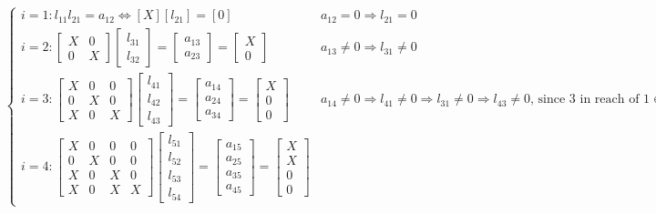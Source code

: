 \documentclass{article}
\begin{document}
\begin{align*}
    &\begin{cases}
        i=1: l_{11}l_{21} = a_{12} \Longleftrightarrow [X][l_{21}] = [0]& a_{12} = 0 \Rightarrow l_{21} = 0 \\
        i=2: \begin{bmatrix} X & 0\\ 0 & X \end{bmatrix} \begin{bmatrix} l_{31} \\ l_{32} \end{bmatrix} = \begin{bmatrix} a_{13}\\a_{23} \end{bmatrix} = \begin{bmatrix} X\\0 \end{bmatrix}& a_{13}\neq 0 \Rightarrow l_{31} \neq 0\\
        i=3: \begin{bmatrix} X & 0 & 0\\ 0 & X & 0\\X & 0 & X \end{bmatrix} \begin{bmatrix} l_{41} \\ l_{42} \\ l_{43} \end{bmatrix} = \begin{bmatrix} a_{14}\\a_{24} \\a_{34}\end{bmatrix} = \begin{bmatrix} X\\0\\0 \end{bmatrix} & a_{14}\neq 0 \Rightarrow l_{41} \neq 0 \Longrightarrow l_{31}\neq 0 \Rightarrow l_{43}\neq 0 \textrm{, since $3$ in reach of $1 \in G_L$}\\
        i=4: \begin{bmatrix} X & 0 & 0&0\\ 0 & X & 0&0\\X & 0 & X &0 \\X&0&X&X\end{bmatrix} \begin{bmatrix} l_{51} \\ l_{52} \\ l_{53}\\l_{54} \end{bmatrix} = \begin{bmatrix} a_{15}\\a_{25} \\a_{35}\\a_{45}\end{bmatrix} = \begin{bmatrix} X\\X\\0\\0 \end{bmatrix} & 

\end{cases}
\end{align*}
\end{document}
